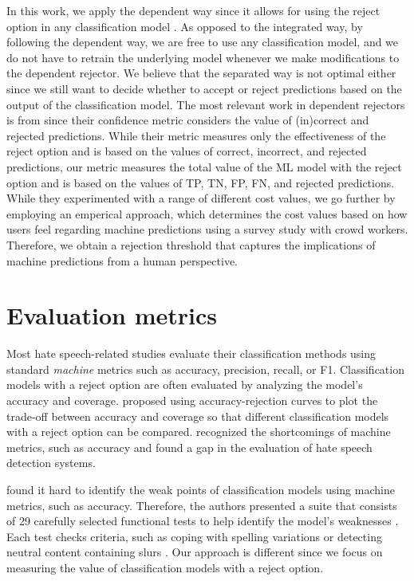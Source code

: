 In this work, we apply the dependent way since it allows for using the reject option in any classification model \citep{hendrickx2021machine}.
%
As opposed to the integrated way, by following the dependent way, we are free to use any classification model, and we do not have to retrain the underlying model whenever we make modifications to the dependent rejector.
%
We believe that the separated way is not optimal either since we still want to decide whether to accept or reject predictions based on the output of the classification model.
%
The most relevant work in dependent rejectors is from \citet{de2000reject} since their confidence metric considers the value of (in)correct and rejected predictions.
%
While their metric measures only the effectiveness of the reject option and is based on the values of correct, incorrect, and rejected predictions, our metric measures the total value of the ML model with the reject option and is based on the values of TP, TN, FP, FN, and rejected predictions.
%
While they experimented with a range of different cost values, we go further by employing an emperical approach, which determines the cost values based on how users feel regarding machine predictions using a survey study with crowd workers.
%
Therefore, we obtain a rejection threshold that captures the implications of machine predictions from a human perspective.

\section{Evaluation metrics}
\label{sec:related-work-evaluation-metrics}
Most hate speech-related studies evaluate their classification methods using standard \textit{machine} metrics such as accuracy, precision, recall, or F1.
% 
Classification models with a reject option are often evaluated by analyzing the model's accuracy and coverage.
%
\citet{nadeem2009reject} proposed using accuracy-rejection curves to plot the trade-off between accuracy and coverage so that different classification models with a reject option can be compared.
%
\citet{rottger2020hatecheck, casati2021value, olteanu2017limits} recognized the shortcomings of machine metrics, such as accuracy and found a gap in the evaluation of hate speech detection systems.
%

%
\citet{rottger2020hatecheck} found it hard to identify the weak points of classification models using machine metrics, such as accuracy.
%
Therefore, the authors presented a suite that consists of 29 carefully selected functional tests to help identify the model's weaknesses \citep{rottger2020hatecheck}.
%
Each test checks criteria, such as coping with spelling variations or detecting neutral content containing slurs \citep{rottger2020hatecheck}.
%
Our approach is different since we focus on measuring the value of classification models with a reject option.
%

